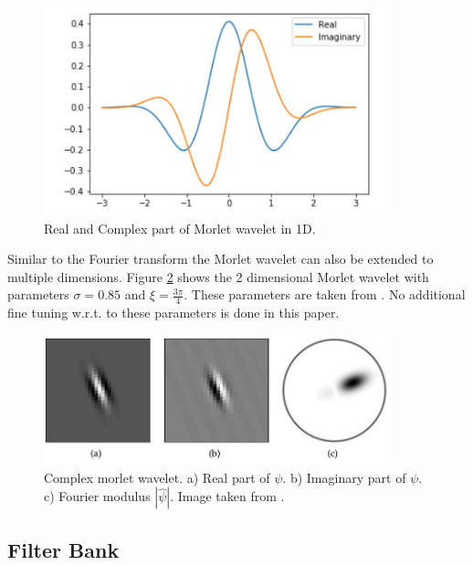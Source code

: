 \begin{figure}[!htb]
	\centering
	\includegraphics[width = 0.9\textwidth]{images/Morlet_wavelet_1D.png}
	\caption{Real and Complex part of Morlet wavelet in 1D. \protect\footnotemark}
	\label{fig:morlet1d}
\end{figure}


Similar to the Fourier transform the Morlet wavelet can also be extended to multiple dimensions. 
Figure \ref{fig:morlet2d} shows the 2 dimensional Morlet wavelet with parameters $\sigma = 0.85$ and $\xi = \frac{3\pi}{4}$. These parameters are taken from \cite{scatteringTransform2012}. No additional fine tuning w.r.t. to these parameters is done in this paper. 

\begin{figure}[!htb]
	\centering
	\includegraphics[width = 0.9\textwidth]{images/morlet2d.png}
	\caption{Complex morlet wavelet. a) Real part of $\psi$. b) Imaginary part of $\psi$. c) Fourier modulus $|\hat{\psi}|$. Image taken from \cite{scatteringTransform2012}.}
	\label{fig:morlet2d}
\end{figure}

\subsection{Filter Bank}
\label{subsec:filter_bank}

